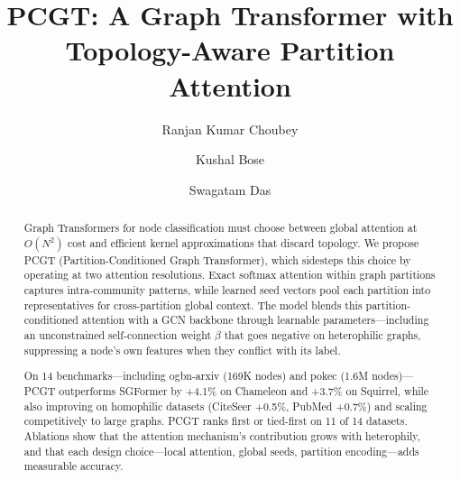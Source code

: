\documentclass[sigconf]{acmart}
\begin{document}
\title{PCGT: A Graph Transformer with Topology-Aware Partition Attention}

\author{Ranjan Kumar Choubey}

\author{Kushal Bose}

\author{Swagatam Das}


\renewcommand{\shortauthors}{Ranjan Kumar Choubey, Kushal Bose, and Swagatam Das}


\begin{abstract}

Graph Transformers for node classification must choose between global attention at $O(N^2)$ cost and efficient kernel approximations that discard topology. We propose PCGT (Partition-Conditioned Graph Transformer), which sidesteps this choice by operating at two attention resolutions. Exact softmax attention within graph partitions captures intra-community patterns, while learned seed vectors pool each partition into representatives for cross-partition global context. The model blends this partition-conditioned attention with a GCN backbone through learnable parameters---including an unconstrained self-connection weight $\beta$ that goes negative on heterophilic graphs, suppressing a node's own features when they conflict with its label.

On 14 benchmarks---including ogbn-arxiv (169K nodes) and pokec (1.6M nodes)---PCGT outperforms SGFormer by +4.1\% on Chameleon and +3.7\% on Squirrel, while also improving on homophilic datasets (CiteSeer +0.5\%, PubMed +0.7\%) and scaling competitively to large graphs. PCGT ranks first or tied-first on 11 of 14 datasets. Ablations show that the attention mechanism's contribution grows with heterophily, and that each design choice---local attention, global seeds, partition encoding---adds measurable accuracy.

\end{abstract}
\end{document}
